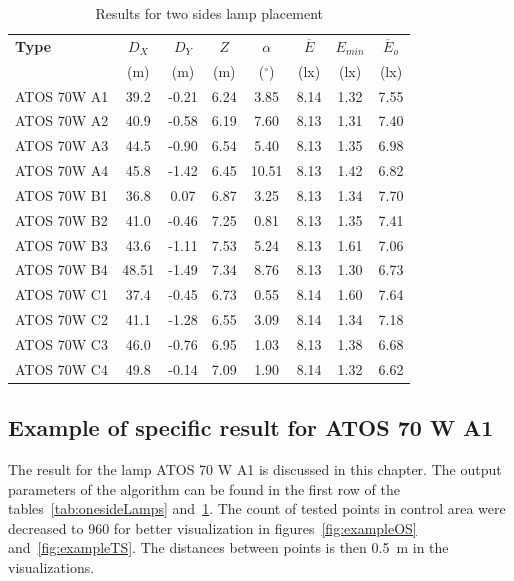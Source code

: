 \begin{table}[htb]
	\renewcommand{\arraystretch}{1.3}
	\caption{Results for two sides lamp placement}
 	\label{tab:twosideLamps}
	\centering
  \begin{tabular}{ l | c | c | c | c | c | c | c }
    \hline
    \textbf{Type} & $D_X$ & $D_Y$ & $Z$ & $\alpha$ & $\overline{E}$ & $E_{min}$ & $\overline{E}_o$\\ 
    & (m) & (m) & (m) & ($^\circ$) & (lx) & (lx) & (lx)\\ \hline
    ATOS 70W A1 & 39.2 & -0.21 & 6.24 & 3.85 & 8.14 & 1.32 & 7.55 \\ \hline
    ATOS 70W A2 & 40.9 & -0.58 & 6.19 & 7.60 & 8.13 & 1.31 & 7.40\\ \hline
    ATOS 70W A3 & 44.5 & -0.90 & 6.54 & 5.40 & 8.13 & 1.35 & 6.98\\ \hline
    ATOS 70W A4 & 45.8 & -1.42 & 6.45 & 10.51 & 8.13 & 1.42 & 6.82\\ \hline\hline
    ATOS 70W B1 & 36.8 & 0.07 & 6.87 & 3.25 & 8.13 & 1.34 & 7.70\\ \hline
    ATOS 70W B2 & 41.0 & -0.46 & 7.25 & 0.81 & 8.13 & 1.35 & 7.41\\ \hline
    ATOS 70W B3 & 43.6 & -1.11 & 7.53 & 5.24 & 8.13 & 1.61 & 7.06\\ \hline
    ATOS 70W B4 & 48.51 & -1.49 & 7.34 & 8.76 & 8.13 & 1.30 & 6.73\\ \hline\hline
    ATOS 70W C1 & 37.4 & -0.45 & 6.73 & 0.55 & 8.14 & 1.60 & 7.64\\ \hline
    ATOS 70W C2 & 41.1 & -1.28 & 6.55 & 3.09 & 8.14 & 1.34 & 7.18\\ \hline
    ATOS 70W C3 & 46.0 & -0.76 & 6.95 & 1.03 & 8.13 & 1.38 & 6.68\\ \hline
    ATOS 70W C4 & 49.8 & -0.14 & 7.09 & 1.90 & 8.14 & 1.32 & 6.62\\ \hline
  \end{tabular}
\end{table}

\subsection{Example of specific result for ATOS 70 W A1}
The result for the lamp ATOS 70 W A1 is discussed in this chapter. The output parameters of the algorithm can be found in the first row of the tables~\ref{tab:onesideLamps} and~\ref{tab:twosideLamps}. The count of tested points in control area were decreased to 960 for better visualization in figures~\ref{fig:exampleOS} and~\ref{fig:exampleTS}. The distances between points is then 0.5~m in the visualizations.


